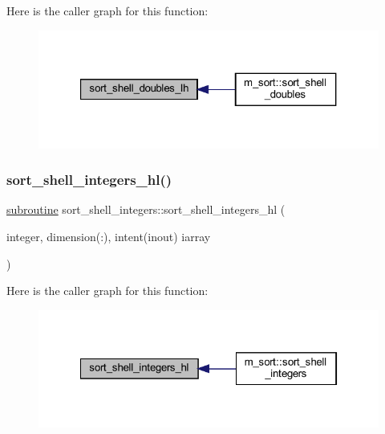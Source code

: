 Here is the caller graph for this function\+:
\nopagebreak
\begin{figure}[H]
\begin{center}
\leavevmode
\includegraphics[width=321pt]{M__sort_8f90_af2227448e8e0e9e8ebc698334dcbc72e_icgraph}
\end{center}
\end{figure}
\mbox{\label{M__sort_8f90_a769d2663d17b93f45135e63626180ee4}} 
\subsubsection{\texorpdfstring{sort\+\_\+shell\+\_\+integers\+\_\+hl()}{sort\_shell\_integers\_hl()}}
{\footnotesize\ttfamily \hyperlink{M__stopwatch_83_8txt_acfbcff50169d691ff02d4a123ed70482}{subroutine} sort\+\_\+shell\+\_\+integers\+::sort\+\_\+shell\+\_\+integers\+\_\+hl (\begin{DoxyParamCaption}\item[{integer, dimension(\+:), intent(inout)}]{iarray }\end{DoxyParamCaption})\hspace{0.3cm}{\ttfamily [private]}}

Here is the caller graph for this function\+:
\nopagebreak
\begin{figure}[H]
\begin{center}
\leavevmode
\includegraphics[width=322pt]{M__sort_8f90_a769d2663d17b93f45135e63626180ee4_icgraph}
\end{center}
\end{figure}
\mbox{\label{M__sort_8f90_a70ecc76a57b8e40ef2343a5e3eb6888e}} 
